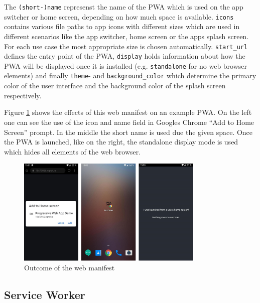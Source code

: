 \begin{center}
	\begin{minipage}{\textwidth}
		
	\end{minipage}
\end{center}

The \texttt{(short-)name} represenst the name of the PWA which is used on the app switcher or home screen, depending on how much space is available. \texttt{icons} contains various file paths to app icons with different sizes which are used in different scenarios like the app switcher, home screen or the apps splash screen. For each use case the most appropriate size is chosen automatically. \texttt{start\_url} defines the entry point of the PWA, \texttt{display} holds information about how the PWA will be displayed once it is installed (e.g. \texttt{standalone} for no web browser elements) and finally \texttt{theme}- and \texttt{background\_color} which determine the primary color of the user interface and the background color of the splash screen respectively. \cite{HowMakePWAs}

Figure \ref{fig:pwa_webmanifest} shows the effects of this web manifest on an example PWA. On the left one can see the use of the icon and name field in Googles Chrome “Add to Home Screen” prompt. In the middle the short name is used due the given space. Once the PWA is launched, like on the right, the standalone display mode is used which hides all elements of the web browser. 

\begin{figure}[htbp] 
	\centering
	\includegraphics[width=0.8\textwidth]{Assets/chapter_pwa/manifest_demo.png}
	\caption{Outcome of the web manifest}
	\label{fig:pwa_webmanifest}
\end{figure}

\subsection{Service Worker}
\label{sec:theorieCc}


